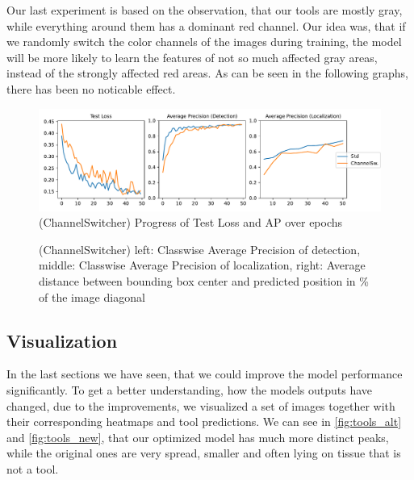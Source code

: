 Our last experiment is based on the observation, that our tools are mostly gray, while everything around them has a dominant red channel. Our idea was, that if we randomly switch the color channels of the images during training, the model will be more likely to learn the features of not so much affected gray areas, instead of the strongly affected red areas. As can be seen in the following graphs, there has been no noticable effect.

\begin{figure}[h]
	\centering
	\includegraphics[width=15cm]{4_experiments/images/2_cs_exp/APs.pdf}
	\caption{(ChannelSwitcher) Progress of Test Loss and AP over epochs}
	\label{fig:cs_aps}
\end{figure}

\begin{figure}[h]
	\centering
	\caption{(ChannelSwitcher) left: Classwise Average Precision of detection, middle: Classwise Average Precision of localization, right: Average distance between bounding box center and predicted position in \% of the image diagonal}
	\label{fig:cd_distances}
\end{figure}


\FloatBarrier
\subsection{Visualization}

In the last sections we have seen, that we could improve the model performance significantly. To get a better understanding, how the models outputs have changed, due to the improvements, we visualized a set of images together with their corresponding heatmaps and tool predictions. We can see in \ref{fig:tools_alt} and \ref{fig:tools_new}, that our optimized model has much more distinct peaks, while the original ones are very spread, smaller and often lying on tissue that is not a tool. 


